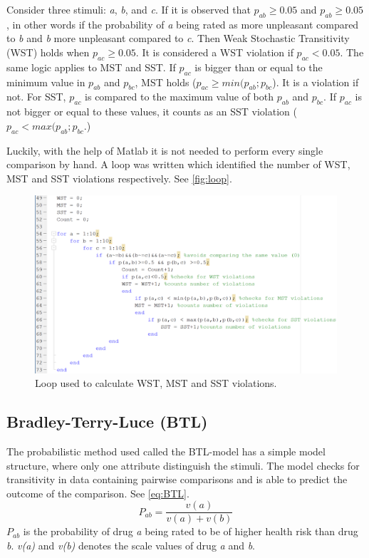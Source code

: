 \noindent
%
Consider three stimuli: \textit{a}, \textit{b}, and \textit{c}. If it is observed that $p_{ab} \geq 0.05$ and $p_{ab} \geq 0.05$, in other words if the probability of \textit{a} being rated as more unpleasant compared to \textit{b} and \textit{b} more unpleasant compared to \textit{c}. Then Weak Stochastic Transitivity (WST) holds when $p_{ac} \geq 0.05$. It is considered a WST violation if $p_{ac} < 0.05$. The same logic applies to MST and SST. If $p_{ac}$ is bigger than or equal to the minimum value in $p_{ab}$ and $p_{bc}$, MST holds ($p_{ac}\geq min(p_{ab};p_{bc}$). It is a violation if not. For SST, $p_{ac}$ is compared to the maximum value of both $p_{ab}$ and $p_{bc}$. If $p_{ac}$ is not bigger or equal to these values, it counts as an SST violation ($p_{ac}< max(p_{ab};p_{bc}$.)

Luckily, with the help of Matlab it is not needed to perform every single comparison by hand. A loop was written which identified the number of WST, MST and SST violations respectively. See \autoref{fig:loop}.
%
\begin{figure}[H]
\centering
\includegraphics[width = \textwidth]{Figure/loop} 
\caption{Loop used to calculate WST, MST and SST violations.}
\label{fig:loop}
\end{figure}
\noindent
%
\subsection*{Bradley-Terry-Luce (BTL)}
The probabilistic method used called the BTL-model has a simple model structure, where only one attribute distinguish the stimuli. The model checks for transitivity in data containing pairwise comparisons and is able to predict the outcome of the comparison. See \autoref{eq:BTL}.
%
\begin{equation}
P_{ab} =\frac{v(a)}{v(a)+v(b)} 
\label{eq:BTL}
\end{equation}
%
$P_{ab}$ is the probability of drug \textit{a} being rated to be of higher health risk than drug \textit{b}. \textit{v(a)} and \textit{v(b)} denotes the scale values of drug \textit{a} and \textit{b}.

